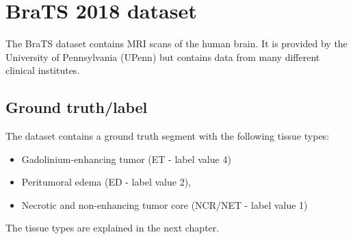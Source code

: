 \section{BraTS 2018 dataset}
The BraTS dataset \cite{menze2015multimodal} contains MRI scans of the human brain. It is provided by the University of Pennsylvania (UPenn) but contains data from many different clinical institutes.





\subsection{Ground truth/label}
The dataset contains a ground truth segment with the following tissue types:

\begin{itemize}
    \item Gadolinium-enhancing tumor (ET - label value 4)
    \item Peritumoral edema (ED - label value 2),
    \item Necrotic and non-enhancing tumor core (NCR/NET - label value 1)
\end{itemize}

The tissue types are explained in the next chapter.
